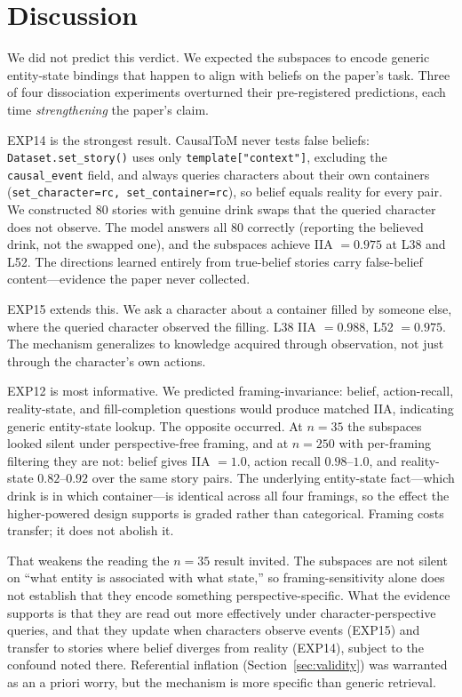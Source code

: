 \documentclass{article}
\begin{document}
\section{Discussion}
\label{sec:discussion}

We did not predict this verdict. We expected the subspaces to encode generic entity-state bindings that happen to align with beliefs on the paper's task. Three of four dissociation experiments overturned their pre-registered predictions, each time \emph{strengthening} the paper's claim.

EXP14 is the strongest result. CausalToM never tests false beliefs: \texttt{Dataset.set\_story()} uses only \texttt{template["context"]}, excluding the \texttt{causal\_event} field, and always queries characters about their own containers (\texttt{set\_character=rc, set\_container=rc}), so belief equals reality for every pair. We constructed 80 stories with genuine drink swaps that the queried character does not observe. The model answers all 80 correctly (reporting the believed drink, not the swapped one), and the subspaces achieve IIA $= 0.975$ at L38 and L52. The directions learned entirely from true-belief stories carry false-belief content---evidence the paper never collected.

EXP15 extends this. We ask a character about a container filled by someone else, where the queried character observed the filling. L38 IIA $= 0.988$, L52 $= 0.975$. The mechanism generalizes to knowledge acquired through observation, not just through the character's own actions.

EXP12 is most informative. We predicted framing-invariance: belief, action-recall, reality-state, and fill-completion questions would produce matched IIA, indicating generic entity-state lookup. The opposite occurred. At $n = 35$ the subspaces looked silent under perspective-free framing, and at $n = 250$ with
per-framing filtering they are not: belief gives IIA $= 1.0$, action recall $0.98$--$1.0$, and
reality-state $0.82$--$0.92$ over the same story pairs. The underlying entity-state
fact---which drink is in which container---is identical across all four framings, so the
effect the higher-powered design supports is graded rather than categorical. Framing costs
transfer; it does not abolish it.

That weakens the reading the $n = 35$ result invited. The subspaces are not silent on
``what entity is associated with what state,'' so framing-sensitivity alone does not
establish that they encode something perspective-specific. What the evidence supports is
that they are read out more effectively under character-perspective queries, and that they
update when characters observe events (EXP15) and transfer to stories where belief diverges
from reality (EXP14), subject to the confound noted there. Referential inflation (Section~\ref{sec:validity}) was warranted as an a priori worry, but the mechanism is more specific than generic retrieval.
\end{document}
